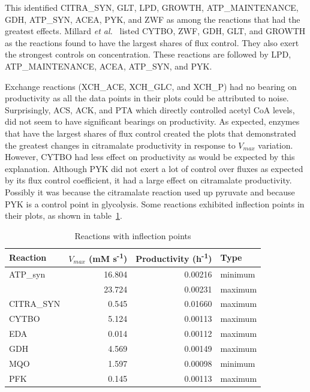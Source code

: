 \documentclass[parskip=full, numbers=noenddot]{scrreprt}
\begin{document}
This identified CITRA\_SYN, GLT, LPD, GROWTH, ATP\_MAINTENANCE, GDH, ATP\_SYN, ACEA, PYK, and ZWF as among the reactions that had the greatest effects. Millard \emph{et al.}~\cite{millard_metabolic_2017} listed CYTBO, ZWF, GDH, GLT, and GROWTH as the reactions found to have the largest shares of flux control. They also exert the strongest controls on concentration. These reactions are followed by LPD, ATP\_MAINTENANCE, ACEA, ATP\_SYN, and PYK.

Exchange reactions (XCH\_ACE, XCH\_GLC, and XCH\_P) had no bearing on productivity as all the data points in their plots could be attributed to noise. Surprisingly, ACS, ACK, and PTA which directly controlled acetyl CoA levels, did not seem to have significant bearings on productivity. As expected, enzymes that have the largest shares of flux control created the plots that demonstrated the greatest changes in citramalate productivity in response to $V_{max}$ variation. However, CYTBO had less effect on productivity as would be expected by this explanation. Although PYK did not exert a lot of control over fluxes as expected by its flux control coefficient, it had a large effect on citramalate productivity. Possibly it was because the citramalate reaction used up pyruvate and because PYK is a control point in glycolysis. Some reactions exhibited inflection points in their plots, as shown in table~\ref{tab:inflection}.

\begin{table}[htbp]
  \caption{Reactions with inflection points}
  \label{tab:inflection}
  \centering
  \begin{tabular}{lrrl}
    \toprule
    Reaction & $V_{max}$ (mM s\textsuperscript{-1}) & Productivity (h\textsuperscript{-1}) & Type\\
    \midrule
    ATP\_syn & 16.804 & 0.00216 & minimum\\
    & 23.724 & 0.00231 & maximum\\
    CITRA\_SYN & 0.545 & 0.01660 & maximum\\
    CYTBO & 5.124 & 0.00113 & maximum\\
    EDA & 0.014 & 0.00112 & maximum\\
    GDH & 4.569 & 0.00149 & maximum\\
    MQO & 1.597 & 0.00098 & minimum\\
    PFK & 0.145 & 0.00113 & maximum\\
    \bottomrule
  \end{tabular}
\end{table}
\end{document}
